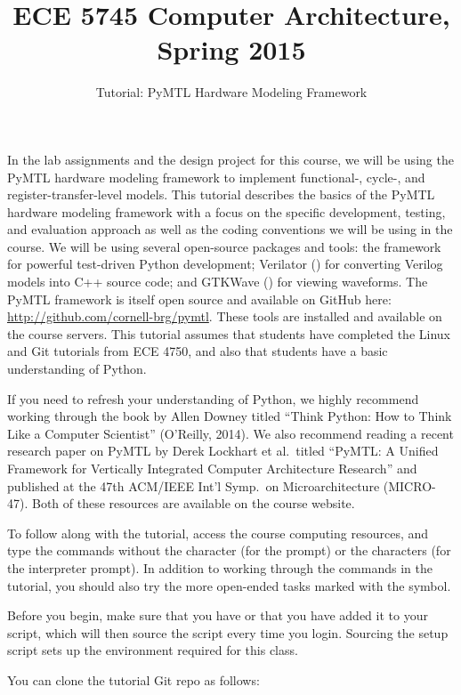 \documentclass{cbxdoc}
\title{ECE 5745 Computer Architecture, Spring 2015}
\subtitle{Tutorial: PyMTL Hardware Modeling Framework}
\begin{document}


\maketitle
\bigskip

In the lab assignments and the design project for this course, we will be
using the PyMTL hardware modeling framework to implement functional-,
cycle-, and register-transfer-level models. This tutorial describes the
basics of the PyMTL hardware modeling framework with a focus on the
specific development, testing, and evaluation approach as well as the
coding conventions we will be using in the course. We will be using
several open-source packages and tools: the  framework for
powerful test-driven Python development; Verilator () for
converting Verilog models into C++ source code; and GTKWave
() for viewing waveforms. The PyMTL framework is itself open
source and available on GitHub here:
\url{http://github.com/cornell-brg/pymtl}. These tools are installed and
available on the course servers. This tutorial assumes that students have
completed the Linux and Git tutorials from ECE 4750, and also that
students have a basic understanding of Python.

If you need to refresh your understanding of Python, we highly recommend
working through the book by Allen Downey titled ``Think Python: How to
Think Like a Computer Scientist'' (O'Reilly, 2014). We also recommend
reading a recent research paper on PyMTL by Derek Lockhart et al.~titled
``PyMTL: A Unified Framework for Vertically Integrated Computer
Architecture Research'' and published at the 47th ACM/IEEE Int'l Symp.~on
Microarchitecture (MICRO-47). Both of these resources are available on
the course website.

To follow along with the tutorial, access the course computing resources,
and type the commands without the \TT{\%} character (for the 
prompt) or the \TT{>{}>{}>} characters (for the  interpreter
prompt). In addition to working through the commands in the tutorial, you
should also try the more open-ended tasks marked with the 
symbol.

Before you begin, make sure that you have  or that you have added it to your 
script, which will then source the script every time you login. Sourcing
the setup script sets up the environment required for this class.

You can clone the tutorial Git repo as follows:
\end{document}
